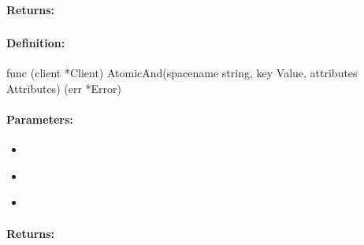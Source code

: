 \paragraph{Returns:}


\pagebreak
\subsubsection{}
\label{api:Go:AtomicAnd}


\paragraph{Definition:}
\begin{gocode}
func (client *Client) AtomicAnd(spacename string, key Value, attributes Attributes) (err *Error)
\end{gocode}

\paragraph{Parameters:}
\begin{itemize}[noitemsep]
\item {}\\

\item {}\\

\item {}\\

\end{itemize}

\paragraph{Returns:}


\pagebreak
\subsubsection{}
\label{api:Go:UxactAtomicAnd}


